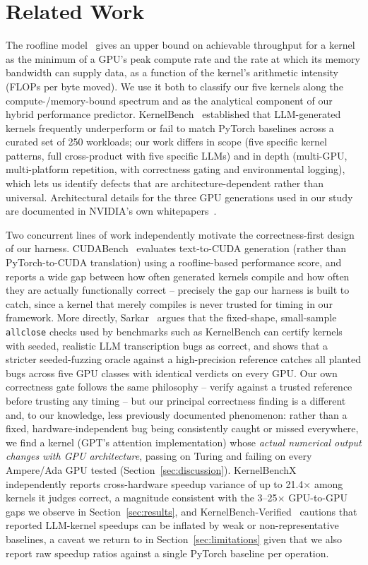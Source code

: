 \documentclass[conference]{IEEEtran}
\begin{document}
\section{Related Work}

The roofline model~\cite{roofline} gives an upper bound on achievable throughput for a kernel as
the minimum of a GPU's peak compute rate and the rate at which its memory bandwidth can supply
data, as a function of the kernel's arithmetic intensity (FLOPs per byte moved). We use it both to
classify our five kernels along the compute-/memory-bound spectrum and as the analytical component
of our hybrid performance predictor. KernelBench~\cite{kernelbench} established that LLM-generated
kernels frequently underperform or fail to match PyTorch baselines across a curated set of 250
workloads; our work differs in scope (five specific kernel patterns, full cross-product with five
specific LLMs) and in depth (multi-GPU, multi-platform repetition, with correctness gating and
environmental logging), which lets us identify defects that are architecture-dependent rather than
universal. Architectural details for the three GPU generations used in our study are documented in
NVIDIA's own whitepapers~\cite{turing,ampere,ada}.

Two concurrent lines of work independently motivate the correctness-first design of our harness.
CUDABench~\cite{cudabench} evaluates text-to-CUDA generation (rather than PyTorch-to-CUDA
translation) using a roofline-based performance score, and reports a wide gap between how often
generated kernels compile and how often they are actually functionally correct -- precisely the
gap our harness is built to catch, since a kernel that merely compiles is never trusted for timing
in our framework. More directly, Sarkar~\cite{correctness-illusion} argues that the fixed-shape,
small-sample \texttt{allclose} checks used by benchmarks such as KernelBench can certify
kernels with seeded, realistic LLM transcription bugs as correct, and shows that a stricter
seeded-fuzzing oracle against a high-precision reference catches all planted bugs across five GPU
classes with identical verdicts on every GPU. Our own correctness gate follows the same
philosophy -- verify against a trusted reference before trusting any timing -- but our principal
correctness finding is a different and, to our knowledge, less previously documented phenomenon:
rather than a fixed, hardware-independent bug being consistently caught or missed everywhere, we
find a kernel (GPT's attention implementation) whose \emph{actual numerical output changes with
GPU architecture}, passing on Turing and failing on every Ampere/Ada GPU tested
(Section~\ref{sec:discussion}). KernelBenchX~\cite{kernelbenchx} independently reports
cross-hardware speedup variance of up to 21.4$\times$ among kernels it judges correct, a
magnitude consistent with the 3--25$\times$ GPU-to-GPU gaps we observe in
Section~\ref{sec:results}, and KernelBench-Verified~\cite{kernelbench-verified} cautions that
reported LLM-kernel speedups can be inflated by weak or non-representative baselines, a caveat we
return to in Section~\ref{sec:limitations} given that we also report raw speedup ratios against a
single PyTorch baseline per operation.
\end{document}
